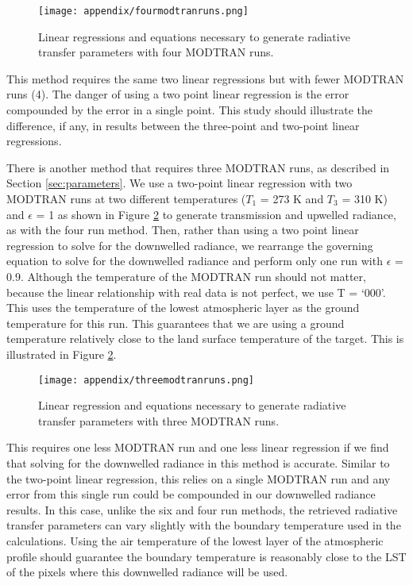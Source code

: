 \documentclass{book}
\begin{document}
\begin{figure}[H]
\centering
\texttt{[image: appendix/fourmodtranruns.png]}
\caption{Linear regressions and equations necessary to generate radiative transfer parameters with four MODTRAN runs.}
\label{fig:fourmodtranruns}
\end{figure}

This method requires the same two linear regressions but with fewer MODTRAN runs (4).  The danger of using a two point linear regression is the error compounded by the error in a single point.  This study should illustrate the difference, if any, in results between the three-point and two-point linear regressions.

There is another method that requires three MODTRAN runs, as described in Section \ref{sec:parameters}.  We use a two-point linear regression with two MODTRAN runs at two different temperatures ($T_1$ = 273 K and $T_3$ = 310 K) and $\epsilon$ = 1 as shown in Figure \ref{fig:threemodtranruns} to generate transmission and upwelled radiance, as with the four run method.  Then, rather than using a two point linear regression to solve for the downwelled radiance, we rearrange the governing equation to solve for the downwelled radiance and perform only one run with $\epsilon$ = 0.9.  Although the temperature of the MODTRAN run should not matter, because the linear relationship with real data is not perfect, we use T = `000'.  This uses the temperature of the lowest atmospheric layer as the ground temperature for this run.  This guarantees that we are using a ground temperature relatively close to the land surface temperature of the target.  This is illustrated in Figure \ref{fig:threemodtranruns}.

\begin{figure}[H]
\centering
\texttt{[image: appendix/threemodtranruns.png]}
\caption{Linear regression and equations necessary to generate radiative transfer parameters with three MODTRAN runs.}
\label{fig:threemodtranruns}
\end{figure}

This requires one less MODTRAN run and one less linear regression if we find that solving for the downwelled radiance in this method is accurate.  Similar to the two-point linear regression, this relies on a single MODTRAN run and any error from this single run could be compounded in our downwelled radiance results.  In this case, unlike the six and four run methods, the retrieved radiative transfer parameters can vary slightly with the boundary temperature used in the calculations.  Using the air temperature of the lowest layer of the atmospheric profile should guarantee the boundary temperature is reasonably close to the LST of the pixels where this downwelled radiance will be used.
\end{document}
